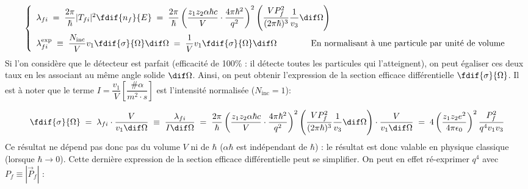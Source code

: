 \[
    \left\{
    \begin{array}{ll}
        \lambda_{fi} \eq
        \dfrac{2\pi}{\hbar} |T_{fi}|^2 \fdif{n_f}{E}
        \eq
        \dfrac{2\pi}{\hbar} 
        \left(
            \dfrac{z_1 z_2\alpha\hbar c}{V} \cdot \dfrac{4 \pi \hbar^2}{q^2}  
        \right)^2
        \left(
        \dfrac{V P_f^2}{(2\pi\hbar)^3}\dfrac{1}{v_3}  \dif\Omega
        \right)
    \\[13pt]
        \lambda_{fi}^\text{exp} 
            \; \equiv \;
        \dfrac{N_\text{inc}}{V} v_1 \fdif{\sigma}{\Omega} \dif\Omega
            \eq
        \dfrac{1}{V} v_1
        \fdif{\sigma}{\Omega} \dif\Omega \qquad \qquad \text{En normalisant à une particule par unité de volume}
    \end{array}
    \right.
\]
Si l'on considère que le détecteur est parfait (efficacité de 100\% : il détecte toutes les particules qui l'atteignent), on peut égaliser ces deux taux en les associant au même angle solide $\dif\Omega$. Ainsi, on peut obtenir l'expression de la section efficace différentielle $\fdif{\sigma}{\Omega}$. Il est à noter que le terme $I = \dfrac{v_1}{V} \left[\dfrac{\# \alpha}{\si{m^2\cdot s}}\right]$ est l'intensité normalisée ($N_\text{inc} = 1$):

\[
    \fdif{\sigma}{\Omega}
        \eq
    \lambda_{fi} \cdot \dfrac{V}{v_1 \dif\Omega}
        \; \equiv \;
    \dfrac{ \lambda_{fi}}{I \dif\Omega}
        \eq
    \dfrac{2\pi}{\hbar} 
    \left(
        \dfrac{z_1 z_2\alpha\hbar c}{V} \cdot \dfrac{4 \pi \hbar^2}{q^2}  
    \right)^2
    \left(
    \dfrac{V P_f^2}{(2\pi\hbar)^3}\dfrac{1}{v_3}  \dif\Omega
    \right)
    \cdot
    \dfrac{V}{v_1 \dif\Omega}
        \eq
    4 \left( \dfrac{z_1 z_2e^2}{4\pi\epsilon_0} \right)^2 \dfrac{P_f^2}{q^4v_1v_3}
\]
Ce résultat ne dépend pas donc pas du volume $V$ ni de $\hbar$ ($\alpha \hbar$ est indépendant de $\hbar$) : le résultat est donc valable en physique classique (lorsque $\hbar \rightarrow 0$).
Cette dernière expression de la section efficace différentielle peut se simplifier. On peut en effet ré-exprimer $q^4$ avec $P_f \equiv |\vec{P}_f|$ :

